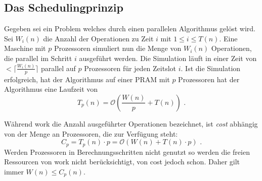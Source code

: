 \subsection{Das Schedulingprinzip}
Gegeben sei ein Problem welches durch einen parallelen Algorithmus gelöst wird.
Sei $W_i(n)$ die Anzahl der Operationen zu Zeit $i$ mit $1 \leq i \leq T(n)$.
Eine Maschine mit $p$ Prozessoren simuliert nun die Menge von $W_i(n)$
Operationen, die parallel im Schritt $i$ ausgeführt werden.
Die Simulation läuft in einer Zeit von $< \lceil \frac{W_i(n)}{p} \rceil$
parallel auf $p$ Prozessoren für jeden Zeitslot $i$.
Ist die Simulation erfolgreich, hat der Algorithmus auf einer PRAM mit $p$
Prozessoren hat der Algorithmus eine Laufzeit von
\begin{equation}
    T_p(n) = \mathcal{O} \left( \frac{W(n)}{p} + T(n) \right) \text{ .}
\end{equation}
\cite[S.28]{jaja}

Während work die Anzahl ausgeführter Operationen bezeichnet, ist \emph{cost}
abhängig von der Menge an Prozessoren, die zur Verfügung steht:
\begin{equation}
    C_p = T_p(n) \cdot p = \mathcal{O} (W(n) + T(n) \cdot p) \text{ .}
\end{equation}
Werden Prozessoren in Berechnungsschritten nicht genutzt so werden die freien
Ressourcen von work nicht berücksichtigt, von cost jedoch schon.
Daher gilt immer $W(n) \leq C_p(n)$.
\cite[S.31]{jaja}

